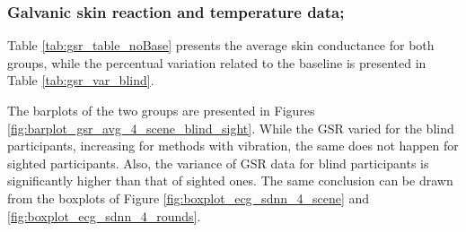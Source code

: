 \subsubsection{Galvanic skin reaction and temperature data;}
\label{subsubsec:results_gsr_temp_2}

Table \ref{tab:gsr_table_noBase} presents the average skin conductance for both groups, while the percentual variation related to the baseline is presented in Table \ref{tab:gsr_var_blind}.





The barplots of the two groups are presented in Figures \ref{fig:barplot_gsr_avg_4_scene_blind_sight}. While the GSR varied for the blind participants, increasing for methods with vibration, the same does not happen for sighted participants. Also, the variance of GSR data for blind participants is significantly higher than that of sighted ones. The same conclusion can be drawn from the boxplots of Figure \ref{fig:boxplot_ecg_sdnn_4_scene} and \ref{fig:boxplot_ecg_sdnn_4_rounds}. 

